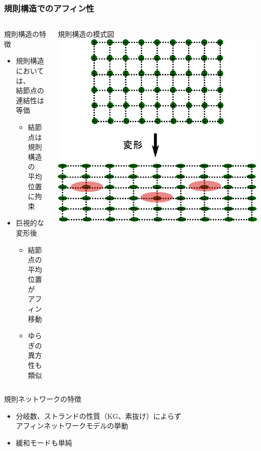 \documentclass[12pt, dvipdfmx]{beamer}
\begin{document}
\begin{frame}
	\frametitle{規則構造でのアフィン性}
		\vspace{-2mm}
		\begin{columns}[totalwidth=\linewidth]
				\begin{block}{規則構造の特徴}
					\begin{itemize}
						\item 規則構造においては、\\結節点の\alert{連結性は等価}
							\begin{itemize}
								\item 結節点は規則構造の\\平均位置に拘束
							\end{itemize}
						\item 巨視的な変形後
							\begin{itemize}
								\item 結節点の\alert{平均位置が\\アフィン移動}
								\item ゆらぎの異方性も類似
							\end{itemize}
					\end{itemize}
				\end{block}
				規則構造の模式図
				\vspace{2mm}
				\includegraphics[width=.9\columnwidth]{reglar_NW_2.png}
		\end{columns}
		\vspace{-2mm}
		\begin{alertblock}{規則ネットワークの特徴}
			\begin{itemize}
				\item 分岐数、ストランドの性質（KG、素抜け）によらず\\ \alert{アフィンネットワークモデルの挙動}
				\item {緩和モードも単純}
			\end{itemize}
		\end{alertblock}
\end{frame}
\end{document}
